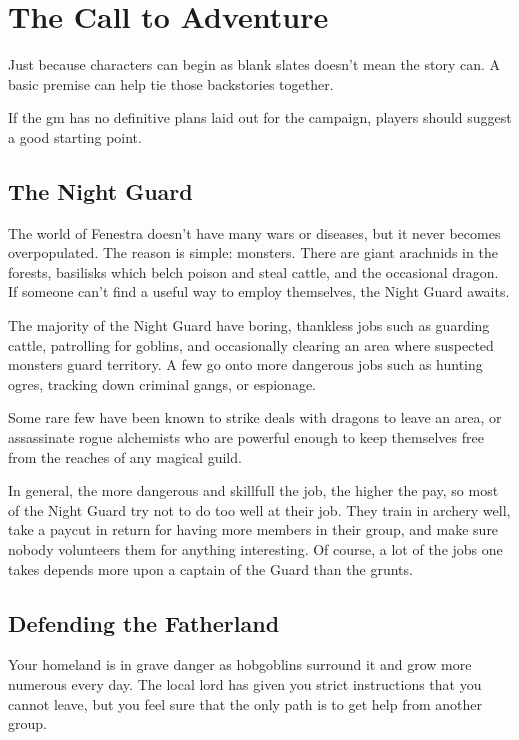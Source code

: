 \documentclass[titlepage,a4paper,openany]{book}
\begin{document}
\section{The Call to Adventure}

\begin{multicols}{2}

Just because characters can begin as blank slates doesn't mean the story can.  A basic premise can help tie those backstories together.

If the \gls{gm} has no definitive plans laid out for the campaign, players should suggest a good starting point.

\subsection{The Night Guard}

The world of Fenestra doesn't have many wars or diseases, but it never becomes overpopulated.  The reason is simple: monsters.  There are giant arachnids in the forests, basilisks which belch poison and steal cattle, and the occasional dragon.  If someone can't find a useful way to employ themselves, the Night Guard awaits.

The majority of the Night Guard have boring, thankless jobs such as guarding cattle, patrolling for goblins, and occasionally clearing an area where suspected monsters guard territory.
A few go onto more dangerous jobs such as hunting ogres, tracking down criminal gangs, or espionage.

Some rare few have been known to strike deals with dragons to leave an area, or assassinate rogue alchemists who are powerful enough to keep themselves free from the reaches of any magical guild.

In general, the more dangerous and skillfull the job, the higher the pay, so most of the Night Guard try not to do too well at their job.  They train in archery well, take a paycut in return for having more members in their group, and make sure nobody volunteers them for anything interesting.  Of course, a lot of the jobs one takes depends more upon a captain of the Guard than the grunts.

\subsection{Defending the Fatherland}

Your homeland is in grave danger as hobgoblins surround it and grow more numerous every day.
The local lord has given you strict instructions that you cannot leave, but you feel sure that the only path is to get help from another group.


\end{multicols}
\end{document}
